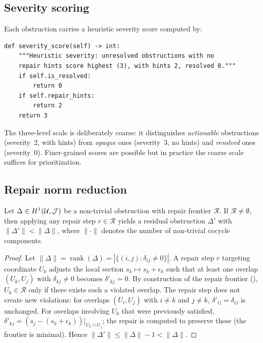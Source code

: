 \documentclass[11pt]{article}
\begin{document}
\subsection{Severity scoring}

Each obstruction carries a heuristic severity score computed by:

\begin{lstlisting}[caption={Severity scoring.},label={lst:severity}]
def severity_score(self) -> int:
    """Heuristic severity: unresolved obstructions with no
    repair hints score highest (3), with hints 2, resolved 0."""
    if self.is_resolved:
        return 0
    if self.repair_hints:
        return 2
    return 3
\end{lstlisting}

\noindent
The three-level scale is deliberately coarse: it distinguishes
\emph{actionable} obstructions (severity~2, with hints) from
\emph{opaque} ones (severity~3, no hints) and \emph{resolved} ones
(severity~0).  Finer-grained scores are possible but in practice the
coarse scale suffices for prioritization.

\subsection{Repair norm reduction}

\begin{theorem}\label{thm:repair}
Let $\Delta \in H^{1}(\mathcal{U}, \mathcal{J})$ be a non-trivial obstruction
with repair frontier $\mathcal{R}$.  If $\mathcal{R} \neq \emptyset$,
then applying any repair step $r \in \mathcal{R}$ yields a residual
obstruction $\Delta'$ with $\|\Delta'\| < \|\Delta\|$, where
$\|\cdot\|$ denotes the number of non-trivial cocycle components.
\end{theorem}

\begin{proof}
Let $\|\Delta\| = \operatorname{rank}(\Delta) = |\{(i,j) : \delta_{ij} \neq 0\}|$.
A repair step $r$ targeting coordinate $U_k$ adjusts the local section
$s_k \mapsto s_k + \epsilon_k$ such that at least one overlap
$(U_k, U_j)$ with $\delta_{kj} \neq 0$ becomes $\delta'_{kj} = 0$.
By construction of the repair frontier (),
$U_k \in \mathcal{R}$ only if there exists such a violated overlap.
The repair step does not create new violations: for overlaps $(U_i, U_j)$
with $i \neq k$ and $j \neq k$, $\delta'_{ij} = \delta_{ij}$ is unchanged.
For overlaps involving $U_k$ that were previously satisfied,
$\delta'_{kj} = (s_j - (s_k + \epsilon_k))|_{U_k \cap U_j}$; the repair
is computed to preserve these (the frontier is minimal).  Hence
$\|\Delta'\| \leq \|\Delta\| - 1 < \|\Delta\|$.
\end{proof}
\end{document}
